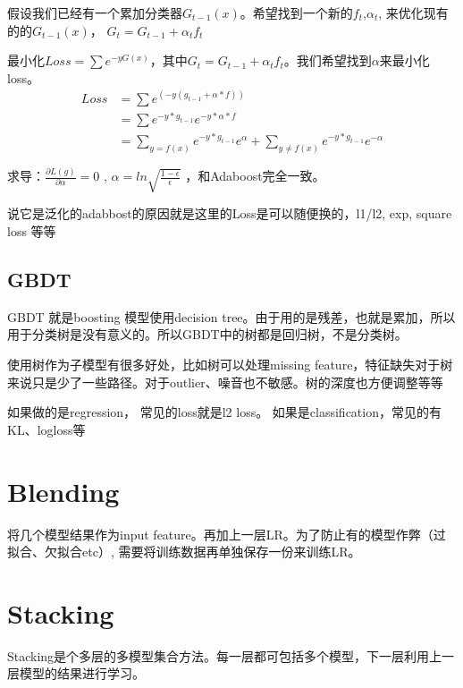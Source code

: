 \documentclass[12pt,a4paper,oneside]{article}
\begin{document}
\begin{CJK*}{UTF8}{gbsn}
假设我们已经有一个累加分类器$G_{t-1}(x)$。希望找到一个新的$f_{t}$,$\alpha_{t}$, 来优化现有的的$G_{t-1}(x)$， $G_{t} = G_{t-1} + \alpha_{t}f_{t}$

最小化$Loss = \sum e^{-yG(x)}$，其中$G_{t} = G_{t-1} + \alpha_{t}f_{t}$。我们希望找到$\alpha$来最小化loss。
\begin{align*}
Loss &= \sum e^{\left(-y(g_{t-1}+\alpha*f)\right)} \\
&= \sum e^{-y*g_{t-1}}e^{-y*\alpha*f} \\
&= \sum_{y=f(x)} e^{-y*g_{t-1}}e^{\alpha} +  \sum_{y\neq f(x)} e^{-y*g_{t-1}}e^{-\alpha} \\ \\
\end{align*}
求导：$\frac{\partial L(g)}{\partial \alpha}=0$ , $\alpha= ln\sqrt{\frac{1-\epsilon}{\epsilon}}$
，和Adaboost完全一致。

说它是泛化的adabbost的原因就是这里的Loss是可以随便换的，l1/l2, exp, square loss 等等

\subsection{GBDT}
GBDT 就是boosting 模型使用decision tree。由于用的是残差，也就是累加，所以用于分类树是没有意义的。所以GBDT中的树都是回归树，不是分类树。

使用树作为子模型有很多好处，比如树可以处理missing feature，特征缺失对于树来说只是少了一些路径。对于outlier、噪音也不敏感。树的深度也方便调整等等

如果做的是regression， 常见的loss就是l2 loss。 如果是classification，常见的有KL、logloss等

\section{Blending}
将几个模型结果作为input feature。再加上一层LR。为了防止有的模型作弊（过拟合、欠拟合etc）, 需要将训练数据再单独保存一份来训练LR。

\section{Stacking}
Stacking是个多层的多模型集合方法。每一层都可包括多个模型，下一层利用上一层模型的结果进行学习。


\end{CJK*}
\end{document}
